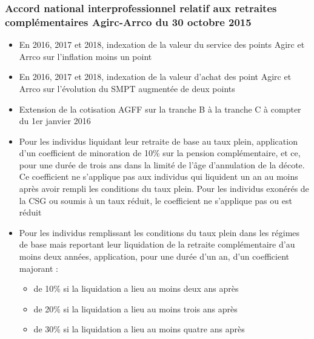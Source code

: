 \subsubsection{Accord national interprofessionnel relatif aux retraites complémentaires Agirc-Arrco du 30 octobre 2015}
\begin{itemize}
   \item En 2016, 2017 et 2018, indexation de la valeur du service des points Agirc et Arrco sur l'inflation moins un point
   \item En 2016, 2017 et 2018, indexation de la valeur d'achat des point Agirc et Arrco sur l'évolution du SMPT augmentée de deux points
   \item Extension de la cotisation AGFF sur la tranche B à la tranche C à compter du 1er janvier 2016
   \item Pour les individus liquidant leur retraite de base au taux plein, application d'un coefficient de minoration de 10\% sur la pension complémentaire, et ce, pour une durée de trois ans dans la limité de l'âge d'annulation de la décote. Ce coefficient ne s'applique pas aux individus qui liquident un an au moins après avoir rempli les conditions du taux plein. Pour les individus exonérés de la CSG ou soumis à un taux réduit, le coefficient ne s'applique pas ou est réduit
   \item Pour les individus remplissant les conditions du taux plein dans les régimes de base mais reportant leur liquidation de la retraite complémentaire d'au moins deux années, application, pour une durée d'un an, d'un coefficient majorant :
   \begin{itemize}
   \item de 10\% si la liquidation a lieu au moins deux ans après
   \item de 20\% si la liquidation a lieu au moins trois ans après
   \item de 30\% si la liquidation a lieu au moins quatre ans après
   \end{itemize}
\end{itemize}



